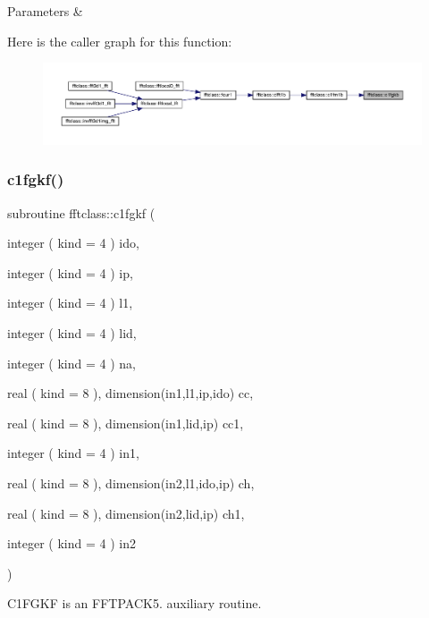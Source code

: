 \begin{DoxyParams}{Parameters}
{\em } & \\
\hline
\end{DoxyParams}
Here is the caller graph for this function\+:\nopagebreak
\begin{figure}[H]
\begin{center}
\leavevmode
\includegraphics[width=350pt]{namespacefftclass_ac9b19ae24fcc92a08a29696cf60fd412_icgraph}
\end{center}
\end{figure}
\mbox{\label{namespacefftclass_ac6d6749fee5ff8e325bdf80834fa5337}} 
\subsubsection{\texorpdfstring{c1fgkf()}{c1fgkf()}}
{\footnotesize\ttfamily subroutine fftclass\+::c1fgkf (\begin{DoxyParamCaption}\item[{integer ( kind = 4 )}]{ido,  }\item[{integer ( kind = 4 )}]{ip,  }\item[{integer ( kind = 4 )}]{l1,  }\item[{integer ( kind = 4 )}]{lid,  }\item[{integer ( kind = 4 )}]{na,  }\item[{real ( kind = 8 ), dimension(in1,l1,ip,ido)}]{cc,  }\item[{real ( kind = 8 ), dimension(in1,lid,ip)}]{cc1,  }\item[{integer ( kind = 4 )}]{in1,  }\item[{real ( kind = 8 ), dimension(in2,l1,ido,ip)}]{ch,  }\item[{real ( kind = 8 ), dimension(in2,lid,ip)}]{ch1,  }\item[{integer ( kind = 4 )}]{in2 }\end{DoxyParamCaption})}



C1\+F\+G\+KF is an F\+F\+T\+P\+A\+C\+K5. auxiliary routine. 

